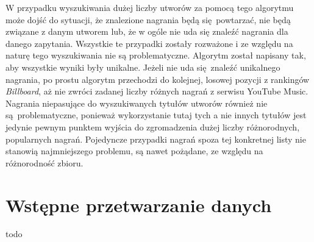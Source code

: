 W przypadku wyszukiwania dużej liczby utworów za pomocą tego algorytmu może dojść do sytuacji, że
znalezione nagrania będą się powtarzać, nie będą związane z danym utworem lub, że w ogóle nie uda
się znaleźć nagrania dla danego zapytania. Wszystkie te przypadki zostały rozważone i ze względu na
naturę tego wyszukiwania nie są problematyczne. Algorytm został napisany tak, aby wszystkie wyniki
były unikalne. Jeżeli nie uda się znaleźć unikalnego nagrania, po prostu algorytm przechodzi do
kolejnej, losowej pozycji z rankingów \emph{Billboard}, aż nie zwróci zadanej liczby różnych nagrań
z serwisu YouTube Music. Nagrania niepasujące do wyszukiwanych tytułów utworów również nie
są problematyczne, ponieważ wykorzystanie tutaj tych a nie innych tytułów jest jedynie pewnym
punktem wyjścia do zgromadzenia dużej liczby różnorodnych, popularnych nagrań. Pojedyncze przypadki
nagrań spoza tej konkretnej listy nie stanowią najmniejszego problemu, są nawet pożądane, ze względu
na różnorodność zbioru.


\section{Wstępne przetwarzanie danych}
todo

% 
